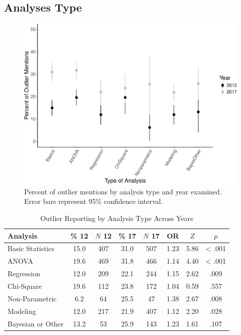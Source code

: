 \documentclass[english,man]{apa6}
\theoremstyle{definition}
\theoremstyle{definition}
\theoremstyle{definition}
\theoremstyle{remark}
\begin{document}
\subsection{Analyses Type}\label{analyses-type}

\begin{figure}
\centering
\includegraphics{outliers_manuscript_files/figure-latex/analyses-graph-1.pdf}
\caption{\label{fig:analyses-graph}Percent of outlier mentions by analysis
type and year examined. Error bars represent 95\% confidence interval.}
\end{figure}

\begin{table}[tbp]
\begin{center}
\begin{threeparttable}
\caption{\label{tab:analysis-table}Outlier Reporting by Analysis Type Across Years}
\begin{tabular}{lccccccc}
\toprule
Analysis & \% 12 & $N$ 12 & \% 17 & $N$ 17 & OR & $Z$ & $p$\\
\midrule
Basic Statistics & 15.0 & 407 & 31.0 & 507 & 1.23 & 5.86 & < .001\\
ANOVA & 19.6 & 469 & 31.8 & 466 & 1.14 & 4.40 & < .001\\
Regression & 12.0 & 209 & 22.1 & 244 & 1.15 & 2.62 & .009\\
Chi-Square & 19.6 & 112 & 23.8 & 172 & 1.04 & 0.59 & .557\\
Non-Parametric & 6.2 & 64 & 25.5 & 47 & 1.38 & 2.67 & .008\\
Modeling & 12.0 & 217 & 21.9 & 407 & 1.12 & 2.20 & .028\\
Bayesian or Other & 13.2 & 53 & 25.9 & 143 & 1.23 & 1.61 & .107\\
\bottomrule
\end{tabular}
\end{threeparttable}
\end{center}
\end{table}
\end{document}
